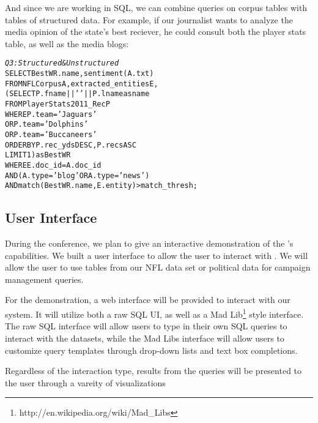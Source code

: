 And since we are working in SQL, we can combine queries on corpus 
tables with tables of structured data. For example, if our journalist
wants to analyze the media opinion of the state's best reciever,
he could consult both the player stats table, as well as the media blogs:

\begin{small}
\begin{alltt}
\textit{Q3: Structured & Unstructured}
SELECT BestWR.name, sentiment(A.txt)
FROM NFLCorpus A, extracted_entities E,
         (SELECT P.fname || ' ' || P.lname as name
          FROM PlayerStats2011_Rec P
          WHERE P.team = 'Jaguars' 
             OR P.team = 'Dolphins' 
             OR P.team = 'Buccaneers'
          ORDER BY P.rec_yds DESC, P.recs ASC
          LIMIT 1) as BestWR
WHERE E.doc_id = A.doc_id 
  AND (A.type = 'blog' OR A.type = 'news')
  AND match(BestWR.name, E.entity) > match\_thresh;
\end{alltt}
\end{small}


\subsection{User Interface}


During the conference, we plan to give an interactive demonstration of the 
{\system}'s capabilities.
We built a user interface to allow the user to interact with \system. 
We will allow the user to use tables from our NFL data set or political data
for campaign management queries.


For the demonstration, a web interface will be provided to interact with our
system. It will utilize both a raw SQL UI, as well as a Mad
Lib\footnote{http://en.wikipedia.org/wiki/Mad\_Libs} style interface. The raw
SQL interface will allow users to type in their own SQL queries to interact with
the datasets, while the Mad Libs interface will allow users to customize query
templates through drop-down lists and text box completions.

Regardless of the interaction type, results from the queries will be presented 
to the user through a vareity of visualizations

